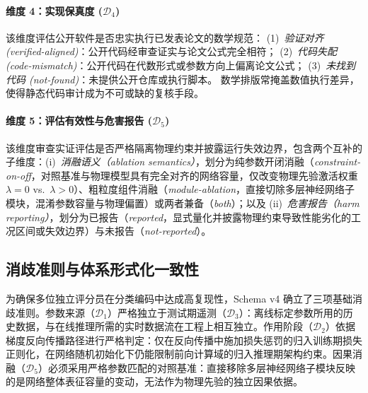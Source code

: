 \paragraph{维度 4：实现保真度 ($\mathcal{D}_4$)}
该维度评估公开软件是否忠实执行已发表论文的数学规范：
(1)~\textit{验证对齐 (verified-aligned)}：公开代码经审查证实与论文公式完全相符；
(2)~\textit{代码失配 (code-mismatch)}：公开代码在代数形式或参数方向上偏离论文公式；
(3)~\textit{未找到代码 (not-found)}：未提供公开仓库或执行脚本。
数学排版常掩盖数值执行差异，使得静态代码审计成为不可或缺的复核手段。

\paragraph{维度 5：评估有效性与危害报告 ($\mathcal{D}_5$)}
该维度审查实证评估是否严格隔离物理约束并披露运行失效边界，包含两个互补的子维度：(i)~\textit{消融语义（ablation semantics）}，划分为纯参数开闭消融（\textit{constraint-on-off}，对照基准与物理模型具有完全对齐的网络容量，仅改变物理先验激活权重 $\lambda=0$ vs.\ $\lambda>0$）、粗粒度组件消融（\textit{module-ablation}，直接切除多层神经网络子模块，混淆参数容量与物理偏置）或两者兼备（\textit{both}）；以及 (ii)~\textit{危害报告（harm reporting）}，划分为已报告（\textit{reported}，显式量化并披露物理约束导致性能劣化的工况区间或失效边界）与未报告（\textit{not-reported}）。

\subsection{消歧准则与体系形式化一致性}
为确保多位独立评分员在分类编码中达成高复现性，Schema v4 确立了三项基础消歧准则。参数来源（$\mathcal{D}_1$）严格独立于测试期遥测（$\mathcal{D}_3$）：离线标定参数所用的历史数据，与在线推理所需的实时数据流在工程上相互独立。作用阶段（$\mathcal{D}_2$）依据梯度反向传播路径进行严格判定：仅在反向传播中施加损失惩罚的归入训练期损失正则化，在网络随机初始化下仍能限制前向计算域的归入推理期架构约束。因果消融（$\mathcal{D}_5$）必须采用严格参数匹配的对照基准：直接移除多层神经网络子模块反映的是网络整体表征容量的变动，无法作为物理先验的独立因果依据。
